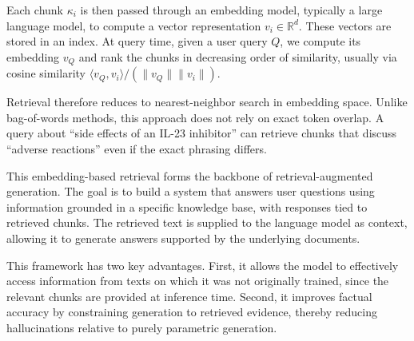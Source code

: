 Each chunk $\kappa_i$ is then passed through an embedding model, typically a large language model, to compute a vector representation $v_i \in \mathbb{R}^d$. These vectors are stored in an index. At query time, given a user query $Q$, we compute its embedding $v_Q$ and rank the chunks in decreasing order of similarity, usually via cosine similarity $\langle v_Q, v_i \rangle / (\|v_Q\| \|v_i\|)$.

Retrieval therefore reduces to nearest-neighbor search in embedding space. Unlike bag-of-words methods, this approach does not rely on exact token overlap. A query about ``side effects of an IL-23 inhibitor'' can retrieve chunks that discuss ``adverse reactions'' even if the exact phrasing differs.

This embedding-based retrieval forms the backbone of retrieval-augmented generation. The goal is to build a system that answers user questions using information grounded in a specific knowledge base, with responses tied to retrieved chunks. The retrieved text is supplied to the language model as context, allowing it to generate answers supported by the underlying documents.

This framework has two key advantages. First, it allows the model to effectively access information from texts on which it was not originally trained, since the relevant chunks are provided at inference time. Second, it improves factual accuracy by constraining generation to retrieved evidence, thereby reducing hallucinations relative to purely parametric generation.

\bigskip

\bigskip


